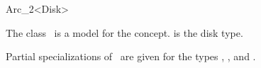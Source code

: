 
\ccRefPageBegin


\begin{ccRefClass}{Arc_2<Disk>}
\label{pageArc_2}

\ccDefinition

The class \ccRefName\ is a model for the  concept.  is
the disk type.

Partial specializations of \ccRefName\ are given for the types
, ,  and
.


\ccIsModel
{}

\end{ccRefClass}

\ccRefPageEnd
